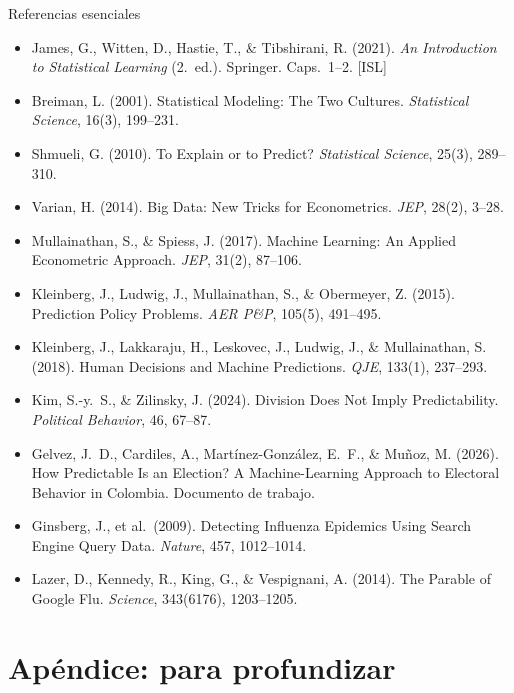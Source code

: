 \documentclass{beamer}
\newcommand{\1}{\mathbb{I}}
\begin{document}
\begin{frame}{Referencias esenciales}
\footnotesize
\begin{itemize}\itemsep2pt
  \item James, G., Witten, D., Hastie, T., \& Tibshirani, R. (2021). \emph{An Introduction to Statistical Learning} (2.\ ed.). Springer. Caps.\ 1--2. [ISL]
  \item Breiman, L. (2001). Statistical Modeling: The Two Cultures. \emph{Statistical Science}, 16(3), 199--231.
  \item Shmueli, G. (2010). To Explain or to Predict? \emph{Statistical Science}, 25(3), 289--310.
  \item Varian, H. (2014). Big Data: New Tricks for Econometrics. \emph{JEP}, 28(2), 3--28.
  \item Mullainathan, S., \& Spiess, J. (2017). Machine Learning: An Applied Econometric Approach. \emph{JEP}, 31(2), 87--106.
  \item Kleinberg, J., Ludwig, J., Mullainathan, S., \& Obermeyer, Z. (2015). Prediction Policy Problems. \emph{AER P\&P}, 105(5), 491--495.
  \item Kleinberg, J., Lakkaraju, H., Leskovec, J., Ludwig, J., \& Mullainathan, S. (2018). Human Decisions and Machine Predictions. \emph{QJE}, 133(1), 237--293.
  \item Kim, S.-y.\ S., \& Zilinsky, J. (2024). Division Does Not Imply Predictability. \emph{Political Behavior}, 46, 67--87.
  \item Gelvez, J.\ D., Cardiles, A., Martínez-González, E.\ F., \& Muñoz, M. (2026). How Predictable Is an Election? A Machine-Learning Approach to Electoral Behavior in Colombia. Documento de trabajo.
  \item Ginsberg, J., et al.\ (2009). Detecting Influenza Epidemics Using Search Engine Query Data. \emph{Nature}, 457, 1012--1014.
  \item Lazer, D., Kennedy, R., King, G., \& Vespignani, A. (2014). The Parable of Google Flu. \emph{Science}, 343(6176), 1203--1205.
\end{itemize}
\normalsize
\end{frame}


\appendix
\section{Apéndice: para profundizar}
\begin{frame}[noframenumbering]
\tableofcontents[currentsection]
\end{frame}
\end{document}

